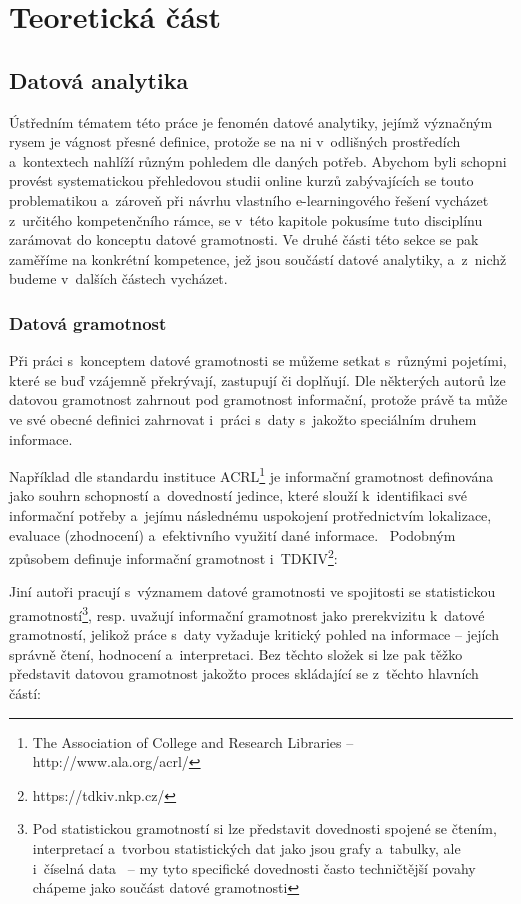 \part{Teoretická část}

\hypertarget{datovuxe1-analytika}{%
\chapter{Datová analytika}\label{datovuxe1-analytika}}

Ústředním tématem této práce je fenomén datové analytiky, jejímž význačným rysem je vágnost přesné definice, protože se na ni v~odlišných prostředích a~kontextech nahlíží různým pohledem dle daných potřeb. Abychom byli schopni provést systematickou přehledovou studii online kurzů zabývajících se touto problematikou a~zároveň při návrhu vlastního e-learningového řešení vycházet z~určitého kompetenčního rámce, se v~této kapitole pokusíme tuto disciplínu zarámovat do konceptu datové gramotnosti. Ve druhé části této sekce se pak zaměříme na konkrétní kompetence, jež jsou součástí datové analytiky, a~z~nichž budeme v~dalších částech vycházet.

\hypertarget{datovuxe1-gramotnost}{%
\section{Datová gramotnost}\label{datovuxe1-gramotnost}}

Při práci s~konceptem datové gramotnosti se můžeme setkat s~různými pojetími, které se buď vzájemně překrývají, zastupují či doplňují. Dle některých autorů lze datovou gramotnost zahrnout pod gramotnost informační, protože právě ta může ve své obecné definici zahrnovat i~práci s~daty s~jakožto speciálním druhem informace.~\parencite[126]{calzada13}

Například dle standardu instituce ACRL\footnote{The Association of College and Research Libraries – http://www.ala.org/acrl/} je informační gramotnost definována jako souhrn schopností a~dovedností jedince, které slouží k~identifikaci své informační potřeby a~jejímu následnému uspokojení protřednictvím lokalizace, evaluace (zhodnocení) a~efektivního využití dané informace.~\parencite[2]{acrl06} Podobným způsobem definuje informační gramotnost i~TDKIV\footnote{https://tdkiv.nkp.cz/}: ~\parencite{tdkiv03}

Jiní autoři pracují s~významem datové gramotnosti ve spojitosti se statistickou gramotností\footnote{Pod statistickou gramotností si lze představit dovednosti spojené se čtením, interpretací a~tvorbou statistických dat jako jsou grafy a~tabulky, ale i~číselná data~\parencite[7]{schield05} – my tyto specifické dovednosti často techničtější povahy chápeme jako součást datové gramotnosti}, resp. uvažují informační gramotnost jako prerekvizitu k~datové gramotností, jelikož práce s~daty vyžaduje kritický pohled na informace -- jejích správně čtení, hodnocení a~interpretaci. Bez těchto složek si lze pak těžko představit datovou gramotnost jakožto proces skládající se z~těchto hlavních částí:~\parencite[8]{schield05}

